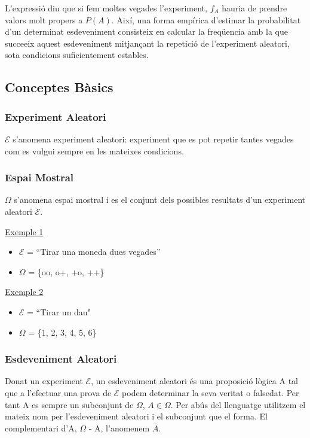 \documentclass{article}
\begin{document}
L’expressió diu que si fem moltes vegades l’experiment, $f_A$ hauria de prendre valors molt propers a $P(A)$. Així, una forma empírica d'estimar la probabilitat d'un determinat esdeveniment consisteix en calcular la freqüencia amb la que succeeix aquest esdeveniment mitjançant la repetició de l'experiment aleatori, sota condicions suficientement estables. 

\subsection{Conceptes Bàsics}
\subsubsection{Experiment Aleatori}
$\mathcal{E}$ s'anomena experiment aleatori: experiment que es pot repetir tantes vegades com es vulgui sempre en les mateixes condicions.

\subsubsection{Espai Mostral}
$\Omega$ s'anomena espai mostral i es el conjunt dels possibles resultats d'un experiment aleatori $\mathcal{E}$.

\underline{Exemple 1}
\begin{itemize}
    \item $\mathcal{E}$ = “Tirar una moneda dues vegades”
    \item $\Omega$ = \{oo, o+, +o, ++\}
\end{itemize}

\underline{Exemple 2}
\begin{itemize}
    \item $\mathcal{E}$ = “Tirar un dau"
    \item $\Omega$ = \{1, 2, 3, 4, 5, 6\}
\end{itemize}

\subsubsection{Esdeveniment Aleatori}
Donat un experiment $\mathcal{E}$, un esdeveniment aleatori és una proposició lògica A tal que a l’efectuar una
prova de $\mathcal{E}$ podem determinar la seva veritat o falsedat. Per tant A es sempre un subconjunt de $\Omega$, $A\in\Omega$. Per abús del llenguatge utilitzem el mateix nom per l'esdeveniment aleatori i el subconjunt que el forma. El complementari d'A, $\Omega$ - A, l'anomenem $\overline{A}$.
\end{document}
